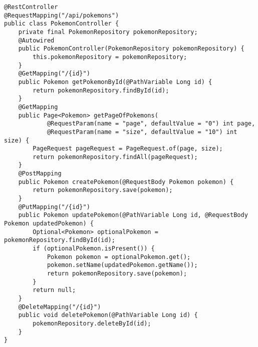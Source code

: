 \documentclass{article}
\begin{document}
\begin{lstlisting}[frame=single, basicstyle=\ttfamily, breaklines=true, breakatwhitespace=true, postbreak=\mbox{\textcolor{red}{$\hookrightarrow$}\space}]
@RestController
@RequestMapping("/api/pokemons")
public class PokemonController {
    private final PokemonRepository pokemonRepository;
    @Autowired
    public PokemonController(PokemonRepository pokemonRepository) {
        this.pokemonRepository = pokemonRepository;
    }
    @GetMapping("/{id}")
    public Pokemon getPokemonById(@PathVariable Long id) {
        return pokemonRepository.findById(id);
    }
    @GetMapping
    public Page<Pokemon> getPageOfPokemons(
            @RequestParam(name = "page", defaultValue = "0") int page,
            @RequestParam(name = "size", defaultValue = "10") int size) {
        PageRequest pageRequest = PageRequest.of(page, size);
        return pokemonRepository.findAll(pageRequest);
    }
    @PostMapping
    public Pokemon createPokemon(@RequestBody Pokemon pokemon) {
        return pokemonRepository.save(pokemon);
    }
    @PutMapping("/{id}")
    public Pokemon updatePokemon(@PathVariable Long id, @RequestBody Pokemon updatedPokemon) {
        Optional<Pokemon> optionalPokemon = pokemonRepository.findById(id);
        if (optionalPokemon.isPresent()) {
            Pokemon pokemon = optionalPokemon.get();
            pokemon.setName(updatedPokemon.getName());
            return pokemonRepository.save(pokemon);
        }
        return null;
    }
    @DeleteMapping("/{id}")
    public void deletePokemon(@PathVariable Long id) {
        pokemonRepository.deleteById(id);
    }
}    
\end{lstlisting}
\end{document}
